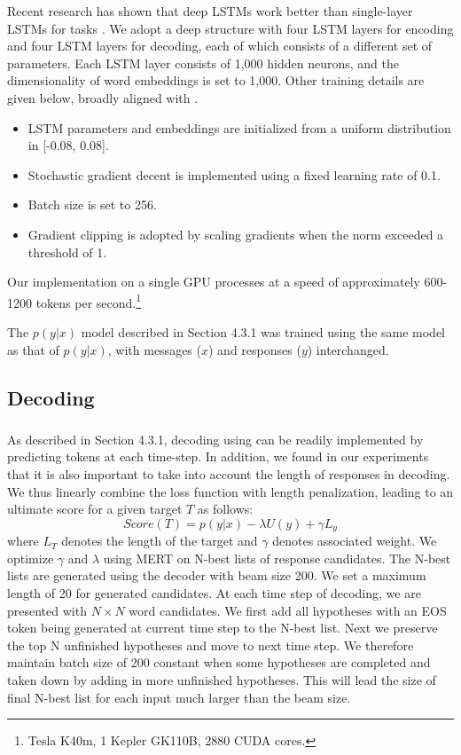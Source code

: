 Recent research has shown that deep LSTMs work better than single-layer LSTMs for \sts tasks \cite{sutskever2014sequence}.
We adopt a deep structure with four LSTM layers for encoding and four LSTM layers for decoding, each of which consists of a different set of parameters. 
Each LSTM layer consists of 1,000 hidden neurons, and the dimensionality of word embeddings is set to 1,000. 
Other training details are given below, broadly aligned with . 
\begin{itemize}[noitemsep,nolistsep]
\item LSTM parameters and embeddings are initialized from a uniform distribution in [-0.08, 0.08].
\item Stochastic gradient decent is implemented using a fixed learning rate of 0.1. 
\item Batch size is set to 256.
\item Gradient clipping is adopted by  scaling gradients when the norm exceeded a threshold of 1. 
\end{itemize}
Our implementation on a single GPU processes at a speed of approximately 600-1200 tokens per second.\footnote{Tesla K40m, 1 Kepler GK110B, 2880 CUDA cores.} 

The $p(y|x)$ model described in Section 4.3.1 was trained using the same model as that of $p(y|x)$, with messages ($x$) and responses ($y$) interchanged.

\subsection{Decoding}
\subsubsection{\mmiLM}
As described in Section 4.3.1, decoding using \mmiLMv %
 can be readily implemented by predicting tokens at each time-step.
 In addition, we found in our experiments that it is also important to take into account the length of responses in decoding.
 We thus linearly combine the loss function with length penalization, leading to an ultimate score for a given target $T$ as follows:
 \begin{equation}
 Score(T)=p(y|x)-\lambda U(y)+\gamma L_y
 \end{equation}
where $L_T$ denotes the length of the target and $\gamma$ denotes associated weight. We optimize $\gamma$ and $\lambda$ using MERT \cite{och2003minimum} on N-best lists of response candidates. 
The N-best lists  are generated using the decoder with beam size 200.
We set a maximum length of 20 for generated candidates. 
At each time
step of decoding, we are presented with $N\times N$
word candidates. We first add all hypotheses with
an EOS token being generated at current time step
to the N-best list. Next we preserve the top N
unfinished hypotheses and move to next time step.
We therefore maintain batch size of 200 constant
when some hypotheses are completed and taken
down by adding in more unfinished hypotheses.
This will lead the size of final N-best list for each
input much larger than the beam size.




